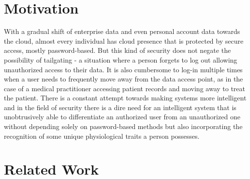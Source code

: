 \documentclass[%
        final,
        notitlepage,
        narroweqnarray,
        inline,
        ]{ieee}
\begin{document}
\section{Motivation}
With a gradual shift of enterprise data and even personal account data towards the cloud, almost every individual has cloud presence that is protected by secure access, mostly password-based. But this kind of security does not negate the possibility of tailgating - a situation where a person forgets to log out allowing unauthorized access to their data. It is also cumbersome to log-in multiple times when a user needs to frequently move away from the data access point, as in the case of a medical practitioner accessing patient records and moving away to treat the patient. There is a constant attempt towards making systems more intelligent and in the field of security there is a dire need for an intelligent system that is unobtrusively able to differentiate an authorized user from an unauthorized one without depending solely on password-based methods but also incorporating the recognition of some unique physiological traits a person possesses.

\section{Related Work}


\end{document}
